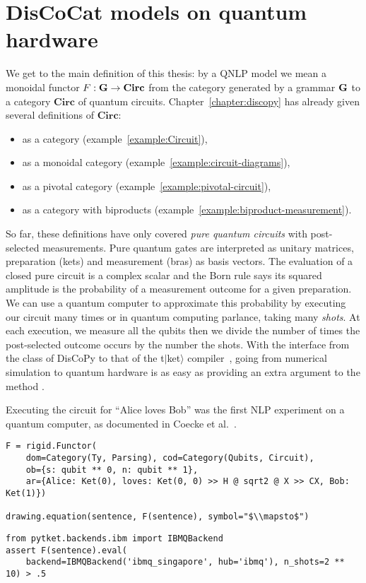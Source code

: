 
\section{DisCoCat models on quantum hardware}\label{section:discocat-qnlp}

We get to the main definition of this thesis: by a QNLP model we mean a monoidal functor $F : \mathbf{G} \to \mathbf{Circ}$ from the category generated by a grammar $\mathbf{G}$ to a category $\mathbf{Circ}$ of quantum circuits.
Chapter~\ref{chapter:discopy} has already given several definitions of $\mathbf{Circ}$:
\begin{itemize}
    \item as a category (example~\ref{example:Circuit}),
    \item as a monoidal category (example~\ref{example:circuit-diagrams}),
    \item as a pivotal category (example~\ref{example:pivotal-circuit}),
    \item as a category with biproducts (example~\ref{example:biproduct-measurement}).
\end{itemize}
So far, these definitions have only covered \emph{pure quantum circuits} with post-selected measurements. Pure quantum gates are interpreted as unitary matrices, preparation (kets) and measurement (bras) as basis vectors.
The evaluation of a closed pure circuit is a complex scalar and the Born rule says its squared amplitude is the probability of a measurement outcome for a given preparation.
We can use a quantum computer to approximate this probability by executing our circuit many times or in quantum computing parlance, taking many \emph{shots}.
At each execution, we measure all the qubits then we divide the number of times the post-selected outcome occurs by the number the shots.
With the interface from the  class of DisCoPy to that of the t$\vert$ket$\rangle$ compiler~\cite{SivarajahEtAl20}, going from numerical simulation to quantum hardware is as easy as providing an extra argument  to the method .

\begin{example}\label{example:circuit-alive-loves-bob}
Executing the circuit for ``Alice loves Bob'' was the first NLP experiment on a quantum computer, as documented in Coecke et al.~\cite{CoeckeEtAl20b}.

\begin{verbatim}
F = rigid.Functor(
    dom=Category(Ty, Parsing), cod=Category(Qubits, Circuit),
    ob={s: qubit ** 0, n: qubit ** 1},
    ar={Alice: Ket(0), loves: Ket(0, 0) >> H @ sqrt2 @ X >> CX, Bob: Ket(1)})

drawing.equation(sentence, F(sentence), symbol="$\\mapsto$")
\end{verbatim}
\begin{verbatim}
from pytket.backends.ibm import IBMQBackend
assert F(sentence).eval(
    backend=IBMQBackend('ibmq_singapore', hub='ibmq'), n_shots=2 ** 10) > .5
\end{verbatim}
\end{example}

